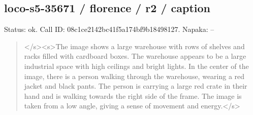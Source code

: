 \documentclass[10pt,a4paper]{article}
\begin{document}
\subsection*{loco-s5-35671 / florence / r2 / caption}
Status: ok. Call ID: 08c1ce2142bc41f5a174bf9b18498127. Napaka: --
\begin{quote}\footnotesize
</s>\allowbreak{}<s>\allowbreak{}The image shows a large warehouse with rows of shelves and racks filled with cardboard boxes. The warehouse appears to be a large industrial space with high ceilings and bright lights. In the center of the image,\allowbreak{} there is a person walking through the warehouse,\allowbreak{} wearing a red jacket and black pants. The person is carrying a large red crate in their hand and is walking towards the right side of the frame. The image is taken from a low angle,\allowbreak{} giving a sense of movement and energy.</s>\allowbreak{}
\end{quote}
\end{document}
